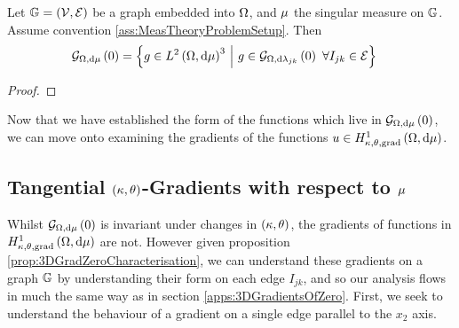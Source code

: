 \begin{prop} \label{prop:3DGradZeroCharacterisation}
	Let $\mathbb{G}=\left( \mathcal{V}, \mathcal{E} \right)$ be a graph embedded into $\Omega$, and $\mu$ the singular measure on $\mathbb{G}$.
	Assume convention \ref{ass:MeasTheoryProblemSetup}.
	Then
	\begin{align*}
		\gradZero{\ddom}{\ddmes} &= \clbracs{ g\in\ltwo{\ddom}{\ddmes}^3 \setVert g\in\gradZero{\ddom}{\lambda_{jk}} \ \forall I_{jk}\in\edgeSet }
	\end{align*}
\end{prop}
\begin{proof}
\end{proof}
Now that we have established the form of the functions which live in $\mathcal{G}_{ \Omega, \mathrm{d}\mu}\left( 0 \right)$, we can move onto examining the gradients of the functions $u\in H^1_{\kappa,\theta,\mathrm{grad}}\left( \Omega, \mathrm{d}\mu \right)$.

\subsection{Tangential $\left( \kappa, \theta \right)$-Gradients with respect to $\mu$} \label{apps:3DTangentialGradients}
Whilst $\mathcal{G}_{ \Omega, \mathrm{d}\mu}\left( 0 \right)$ is invariant under changes in $\left( \kappa, \theta \right)$, the gradients of functions in $H^1_{\kappa,\theta,\mathrm{grad}}\left( \Omega, \mathrm{d}\mu \right)$ are not.
However given proposition \ref{prop:3DGradZeroCharacterisation}, we can understand these gradients on a graph $\mathbb{G}$ by understanding their form on each edge $I_{jk}$, and so our analysis flows in much the same way as in section \ref{apps:3DGradientsOfZero}.
First, we seek to understand the behaviour of a gradient on a single edge parallel to the $x_2$ axis.

